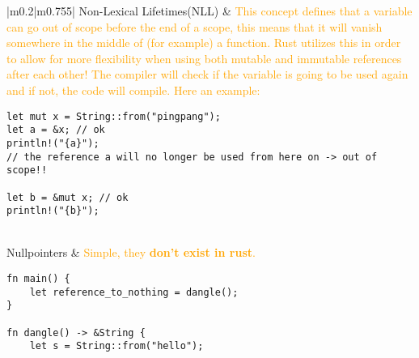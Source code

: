 \documentclass[main.tex,fontsize=8pt,paper=a4,paper=portrait,DIV=calc,]{scrartcl}
\begin{document}
\begin{table}[ht!]
\begin{tabular}{|m{0.2\linewidth}|m{0.755\linewidth}|}
\hline
Non-Lexical Lifetimes(NLL) & 
\textcolor{orange}{This concept defines that a variable can go out of scope before the end of a scope, this means that it will vanish somewhere in the middle of (for example) a function.\newline
Rust utilizes this in order to allow for more flexibility when using both mutable and immutable references after each other!\newline
The compiler will check if the variable is going to be used again and if not, the code will compile. Here an example:}\newline
\begin{lstlisting}
let mut x = String::from("pingpang");
let a = &x; // ok
println!("{a}");
// the reference a will no longer be used from here on -> out of scope!!

let b = &mut x; // ok
println!("{b}");
\end{lstlisting}\\
\hline
Nullpointers & 
\textcolor{orange}{Simple, they \textbf{don't exist in rust}.}\newline
\begin{lstlisting}
fn main() {
    let reference_to_nothing = dangle();
}

fn dangle() -> &String {
    let s = String::from("hello");


\end{lstlisting}
\end{tabular}
\end{table}
\end{document}
